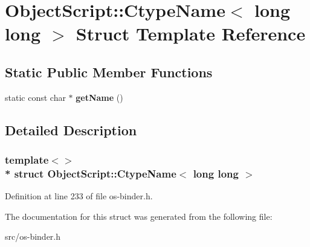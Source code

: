 \hypertarget{struct_object_script_1_1_ctype_name_3_01long_01long_01_4}{}\section{Object\+Script\+:\+:Ctype\+Name$<$ long long $>$ Struct Template Reference}
\label{struct_object_script_1_1_ctype_name_3_01long_01long_01_4}
\subsection*{Static Public Member Functions}
\begin{DoxyCompactItemize}
\item 
static const char $\ast$ {\bfseries get\+Name} ()\hypertarget{struct_object_script_1_1_ctype_name_3_01long_01long_01_4_a81177c278d2d417efd2099c77331da12}{}\label{struct_object_script_1_1_ctype_name_3_01long_01long_01_4_a81177c278d2d417efd2099c77331da12}

\end{DoxyCompactItemize}


\subsection{Detailed Description}
\subsubsection*{template$<$$>$\\*
struct Object\+Script\+::\+Ctype\+Name$<$ long long $>$}



Definition at line 233 of file os-\/binder.\+h.



The documentation for this struct was generated from the following file\+:\begin{DoxyCompactItemize}
\item 
src/os-\/binder.\+h\end{DoxyCompactItemize}
